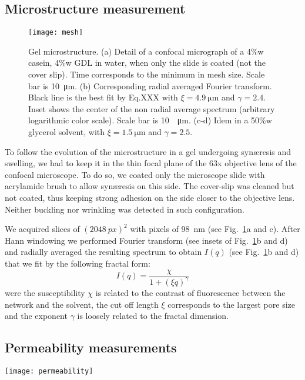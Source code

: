 \documentclass[twocolumn,superscriptaddress,showpacs,preprintnumbers,amsmath,amssymb,prl]{revtex4-1}
\begin{document}
\subsection*{Microstructure measurement}

\begin{figure}
	\texttt{[image: mesh]}
	\caption{Gel microstructure. (a) Detail of a confocal micrograph of a 4\%w casein, 4\%w GDL in water, when only the slide is coated (not the cover slip). Time corresponds to the minimum in mesh size. Scale bar is \SI{10}{\micro\metre}. (b) Corresponding radial averaged Fourier transform. Black line is the best fit by Eq.XXX with $\xi=\SI{4.9}{\micro\metre}$ and $\gamma=2.4$. Inset shows the center of the non radial average spectrum (arbitrary logarithmic color scale). Scale bar is \SI{10}{\per\micro\metre}. (c-d) Idem in a 50\%w glycerol solvent, with $\xi=\SI{1.5}{\micro\metre}$ and $\gamma=2.5$.}
	\label{fig:mesh}
\end{figure}

To follow the evolution of the microstructure in a gel undergoing syn\ae{}resis and swelling, we had to keep it in the thin focal plane of the 63x objective lens of the confocal microscope. To do so, we coated only the microscope slide with acrylamide brush to allow syn\ae{}resis on this side. The cover-slip was cleaned but not coated, thus keeping strong adhesion on the side closer to the objective lens. Neither buckling nor wrinkling was detected in such configuration.

We acquired slices of $(\SI{2048}{px})^2$ with pixels of \SI{98}{\nano\metre} (see Fig.~\ref{fig:mesh}a and c). After Hann windowing we performed Fourier transform (see insets of Fig.~\ref{fig:mesh}b and d) and radially averaged the resulting spectrum to obtain $I(q)$ (see Fig.~\ref{fig:mesh}b and d) that we fit by the following fractal form:
\begin{equation}
I(q) = \frac{\chi}{1+(\xi q)^\gamma}
\end{equation}
were the susceptibility $\chi$ is related to the contrast of fluorescence between the network and the solvent, the cut off length $\xi$ corresponds to the largest pore size and the exponent $\gamma$ is loosely related to the fractal dimension. 

\subsection*{Permeability measurements}
\begin{figure*}
	\texttt{[image: permeability]}
	\caption{Permeability measurements. (a) Schematic representation of the experiment. (b-c) Evolution of the height of the interface in tube 1 relative to the final height in tube 2. Black line is the best exponential fit $Ae^{-t/\tau}$. (b) Gel is 4\%w casein, 4\%w GDL in water, $H=\SI{2.3}{\milli\metre}$ and $\tau=\SI{57}{\minute}$. (c) Idem in 50\%w glycerol, $H=\SI{4}{\milli\metre}$ and $\tau=\SI{100}{\hour}$.}
	\label{fig:permeability}
\end{figure*}
\end{document}

